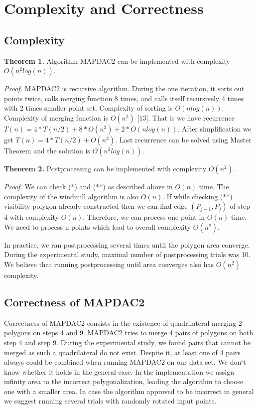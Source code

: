 \documentclass[conference]{IEEEtran}
\begin{document}
	\section {Complexity and Correctness}
	\label{S3}
		\subsection {Complexity}
			\textbf{Theorem 1.}
			Algorithm MAP{\textunderscore}DAC2 can be implemented with complexity $O(n^{2}log(n))$.
			
			\textit{Proof.}
			MAP{\textunderscore}DAC2 is recursive algorithm.
			During the one iteration, it sorts out points twice, calls merging function 8 times, and calls itself recursively 4 times with 2 times smaller point set.
			Complexity of sorting is $O(n log(n))$.
			Complexity of merging function is $O(n^{2})$ [13].
			That is we have recurrence $T(n) = 4*T(n/2) + 8 * O(n^{2}) + 2 * O(n log(n))$.
			After simplification we get $T(n) = 4*T(n/2) + O(n^{2})$.
			Last recurrence can be solved using Master Theorem and the solution is $O(n^{2}log(n))$.
	
			\textbf{Theorem 2.}
			Postprocessing can be implemented with complexity $O(n^{2})$.
			
			\textit{Proof.}
			We can check (*) and (**) as described above in $O(n)$ time.
			The complexity of the windmill algorithm is also $O(n)$.
			If while checking (**) visibility polygon already constructed then we can find edge $(P_{j-1}, P_{j})$ of step 4 with complexity $O(n)$.
			Therefore, we can process one point in $O(n)$ time.
			We need to process n points which lead to overall complexity $O(n^{2})$.
	
			In practice, we ran postprocessing several times until the polygon area converge.
			During the experimental study, maximal number of postprocessing trials was 10.
			We believe that running postprocessing until area converges also has $O(n^{2})$ complexity.
			
		\subsection {Correctness of MAP{\textunderscore}DAC2}
			Correctness of MAP{\textunderscore}DAC2 consists in the existence of quadrilateral merging 2 polygons on steps 4 and 9.
			MAP{\textunderscore}DAC2 tries to merge 4 pairs of polygons on both step 4 and step 9.
			During the experimental study, we found pairs that cannot be merged as such a quadrilateral do not exist.
			Despite it, at least one of 4 pairs always could be combined when running MAP{\textunderscore}DAC2 on our data set.
			We don`t know whether it holds in the general case.
			In the implementation we assign infinity area to the incorrect polygonalization, leading the algorithm to choose one with a smaller area.
			In case the algorithm approved to be incorrect in general we suggest running several trials with randomly rotated input points.
	
\end{document}
